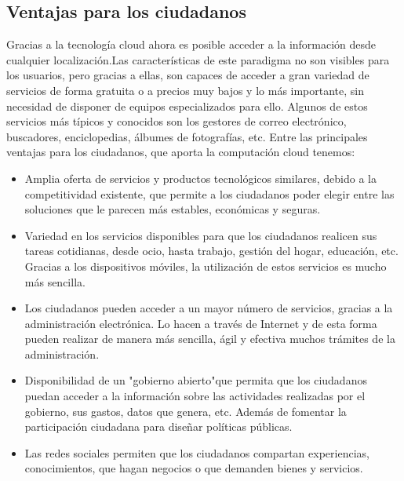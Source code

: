 \documentclass[a4paper, 12pt]{report}
\begin{document}
\subsection{Ventajas para los ciudadanos}
\begin{justify}
Gracias a la tecnolog\'ia cloud ahora es posible acceder a la informaci\'on desde cualquier localizaci\'on.Las caracter\'isticas de este paradigma no son visibles para los usuarios, pero gracias a ellas, son capaces de acceder a gran variedad de servicios de forma gratuita o a precios muy bajos y lo m\'as importante, sin necesidad de disponer de equipos especializados para ello. Algunos de estos servicios más t\'ipicos y conocidos son los gestores de correo electr\'onico, buscadores, enciclopedias, \'albumes de fotograf\'ias, etc.
Entre las principales ventajas para los ciudadanos, que aporta la computaci\'on cloud tenemos:
				\begin{itemize}
						\item{}Amplia oferta de servicios y productos tecnol\'ogicos similares, debido a la competitividad existente, que permite a los ciudadanos poder elegir entre las soluciones que le parecen m\'as estables, econ\'omicas y seguras.
						\item{}Variedad en los servicios disponibles para que los ciudadanos realicen sus tareas cotidianas, desde ocio, hasta trabajo, gesti\'on del hogar, educaci\'on, etc. Gracias a los dispositivos m\'oviles, la utilizaci\'on de estos servicios es mucho m\'as sencilla.
						\item{}Los ciudadanos pueden acceder a un mayor n\'umero de servicios, gracias a la administración electr\'onica. Lo hacen a trav\'es de Internet y de esta forma pueden realizar de manera m\'as sencilla, \'agil y efectiva muchos tr\'amites de la administraci\'on.
						\item{}Disponibilidad de un "gobierno abierto"\hspace{0.1cm}que permita que los ciudadanos puedan acceder a la informaci\'on sobre las actividades realizadas por el gobierno, sus gastos, datos que genera, etc. Además de fomentar la participaci\'on ciudadana para diseñar pol\'iticas p\'ublicas.
						\item{}Las redes sociales permiten que los ciudadanos compartan experiencias, conocimientos, que hagan negocios o que demanden bienes y servicios.
				\end{itemize}
\end{justify}
\newpage
\end{document}
